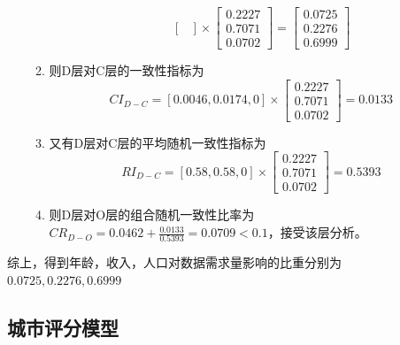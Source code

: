 \documentclass[UTF8,12pt]{ctexart}
\begin{document}
\begin{enumerate}
\begin{enumerate}
\begin{itemize}
$$\begin{bmatrix}
                     \end{bmatrix}×\begin{bmatrix}
                        0.2227 \\
                        0.7071 \\
                        0.0702
                     \end{bmatrix}=\begin{bmatrix}
                        0.0725 \\
                        0.2276 \\
                        0.6999
                     \end{bmatrix}$$
                    \end{itemize}                    
                \item 则D层对C层的一致性指标为
                    $$CI_{D-C}=[0.0046,0.0174,0]×\begin{bmatrix}
                    0.2227 \\
                    0.7071 \\
                    0.0702
                     \end{bmatrix}=0.0133$$
                \item 又有D层对C层的平均随机一致性指标为
                    $$RI_{D-C}=[0.58,0.58,0]×\begin{bmatrix}
                    0.2227 \\
                    0.7071 \\
                    0.0702
                     \end{bmatrix}=0.5393$$
                \item 则D层对O层的组合随机一致性比率为
                    $CR_{D-O}=0.0462+\displaystyle\frac{0.0133}{0.5393}=
                    0.0709<0.1$，接受该层分析。
            \end{enumerate}

        \end{enumerate}
        综上，得到年龄，收入，人口对数据需求量影响的比重分别为$0.0725,0.2276,0.6999$
        


    \subsection{城市评分模型}\label{PingFen}
\end{document}
